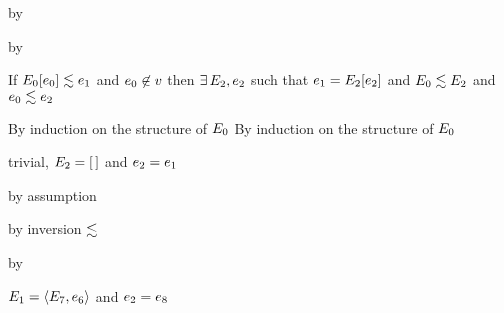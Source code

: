 {\begin{lamportproof*}
    \begin{pfproof}
        \begin{pfproof}
          by 
        \end{pfproof}
      \qedstep
        \begin{pfproof}
          by 
        \end{pfproof}
    \end{pfproof}

\end{lamportproof*}}

\begin{lemma}\label{H-context-matching}\leavevmode
  If\/ $E_0[e_0] \lesssim e_1$
  and\/ $e_0 \not\in v$
  then\/ $\exists\,E_2,e_2$
  such that\/ $e_1 = E_2[e_2]$
  and\/ $E_0 \lesssim E_2$
  and\/ $e_0 \lesssim e_2$
\end{lemma}{
  \newcommand{\shortpf}{By induction on the structure of $\ctx_0$}
\begin{lamportproof*}
  \shortpf
\mainproof
  \shortpf

    \begin{pfproof}
      trivial, $E_2 = {[\,]}$ and $e_2 = e_1$
    \end{pfproof}

    \begin{pfproof}
        \begin{pfproof}
          by assumption
        \end{pfproof}
        \begin{pfproof}
          by inversion $\lesssim$
        \end{pfproof}
        \begin{pfproof}
          by \pfih
        \end{pfproof}
      \qedstep
        \begin{pfproof}
          $E_1 = \langle E_7,e_6 \rangle$ and $e_2 = e_8$
        \end{pfproof}
    \end{pfproof}


\end{lamportproof*}}
